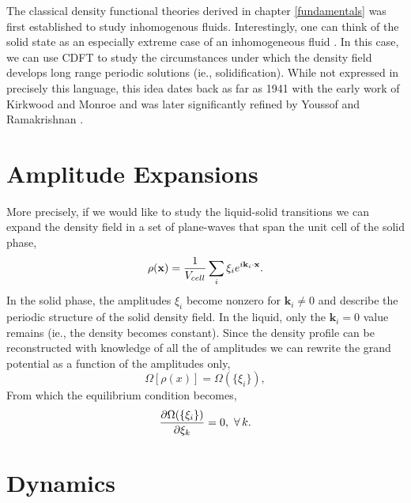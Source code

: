 The classical density functional theories derived in chapter \ref{fundamentals} was first established to study inhomogenous fluids.
Interestingly, one can think of the solid state as an especially extreme case of an inhomogeneous fluid \cite{HANSEN-CH6}.
In this case, we can use CDFT to study the circumstances under which the density field develops long range periodic solutions (ie., solidification).
While not expressed in precisely this language, this idea dates back as far as 1941 with the early work of Kirkwood and Monroe \cite{KIRKWOOD_MONROE41} and was later significantly refined by Youssof and Ramakrishnan \cite{RAMAKRISHNAN79}.

\section{Amplitude Expansions} %

More precisely, if we would like to study the liquid-solid transitions we can expand the density field in a set of plane-waves that span the unit cell of the solid phase,
%
\begin{equation}
    \rho(\mathbf{x}) = \frac{1}{V_{cell}} \sum_i \xi_i e^{i \mathbf{k}_i \cdot \mathbf{x}}.
\end{equation}
%
In the solid phase, the amplitudes $\xi_i$ become nonzero for $\mathbf{k}_i \ne 0$ and describe the periodic structure of the solid density field.
In the liquid, only the $\mathbf{k}_i = 0$ value remains (ie., the density becomes constant).
Since the density profile can be reconstructed with knowledge of all the of amplitudes we can rewrite the grand potential as a function of the amplitudes only, 
%
\begin{equation}
    \Omega[\rho(x)] = \Omega(\lbrace\xi_i\rbrace),
\end{equation}
%
From which the equilibrium condition becomes,
%
\begin{equation}
    \frac{\partial \Omega(\lbrace\xi_i\rbrace)}{\partial \xi_k} = 0, \,\,\forall \,k.
\end{equation}
%

\section{Dynamics} %

